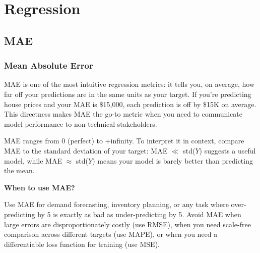 \chapter{Regression}

\clearpage
\thispagestyle{regressionstyle}
\section{MAE}
\subsection{Mean Absolute Error}

MAE is one of the most intuitive regression metrics: it tells you, on average, how far off your predictions are in the same units as your target.
If you're predicting house prices and your MAE is \$15,000, each prediction is off by \$15K on average. This directness makes MAE the go-to metric
when you need to communicate model performance to non-technical stakeholders.

\begin{center}
\end{center}

MAE ranges from 0 (perfect) to +infinity. To interpret it in context, compare MAE to the standard deviation of your target:
MAE $\ll$ std($Y$) suggests a useful model, while MAE $\approx$ std($Y$) means your model is barely better than predicting the mean.

\textbf{When to use MAE?}

Use MAE for demand forecasting, inventory planning, or any task where over-predicting by 5 is exactly as bad as under-predicting by 5.
Avoid MAE when large errors are disproportionately costly (use RMSE), when you need scale-free comparison across different targets (use MAPE),
or when you need a differentiable loss function for training (use MSE).

